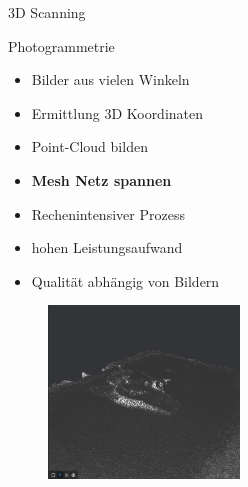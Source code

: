 \begin{frame}[m]{3D Scanning}
    \begin{minipage}{.49\textwidth}
    \begin{block}{Photogrammetrie}
        \begin{itemize}
            \item Bilder aus vielen Winkeln
            \item Ermittlung 3D Koordinaten
            \item Point-Cloud bilden
            \item \textbf{Mesh Netz spannen}
            \item Rechenintensiver Prozess
            \item hohen Leistungsaufwand
            \item Qualität abhängig von Bildern
        \end{itemize}
    \end{block}
    \end{minipage}
    \begin{minipage}[m]{.49\textwidth}
        \begin{figure}[]
          \includegraphics[height=130pt]{img_niklas/image_anlasserMesh.PNG}
          \label{fig:my_label}
      \end{figure}    
    \end{minipage}
    
\end{frame}

